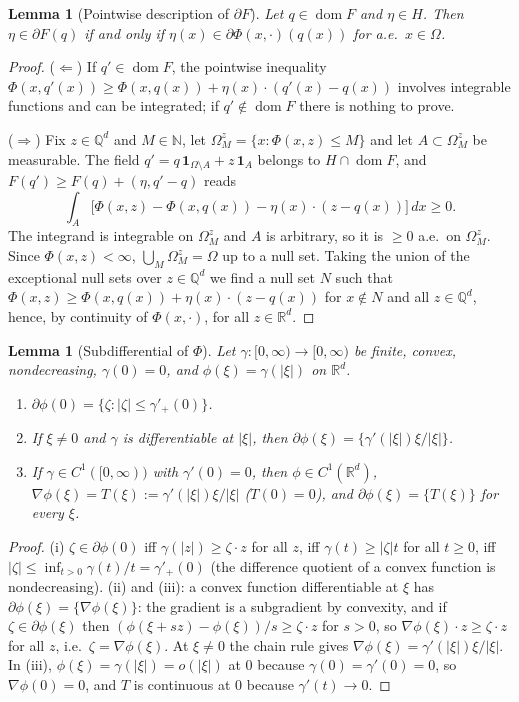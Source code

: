 \documentclass[11pt]{amsart}
\newtheorem{lemma}[theorem]{Lemma}
\theoremstyle{definition}
\theoremstyle{remark}
\numberwithin{equation}{section}
\newcommand{\R}{\mathbb{R}}
\newcommand{\Q}{\mathbb{Q}}
\newcommand{\dx}{\,dx}
\newcommand{\abs}[1]{\lvert #1\rvert}
\DeclareMathOperator{\dom}{dom}
\begin{document}
\begin{lemma}[Pointwise description of $\partial F$]\label{lem:pointwise}
Let $q\in\dom F$ and $\eta\in H$. Then $\eta\in\partial F(q)$ if and only if $\eta(x)\in\partial\Phi(x,\cdot)(q(x))$ for a.e.\ $x\in\Omega$.
\end{lemma}
\begin{proof}
($\Leftarrow$) If $q'\in\dom F$, the pointwise inequality $\Phi(x,q'(x))\ge\Phi(x,q(x))+\eta(x)\cdot(q'(x)-q(x))$ involves integrable functions and can be integrated; if $q'\notin\dom F$ there is nothing to prove.

($\Rightarrow$) Fix $z\in\Q^d$ and $M\in\mathbb N$, let $\Omega^z_M=\{x:\Phi(x,z)\le M\}$ and let $A\subset\Omega^z_M$ be measurable. The field $q'=q\,\mathbf 1_{\Omega\setminus A}+z\,\mathbf 1_A$ belongs to $H\cap\dom F$, and $F(q')\ge F(q)+(\eta,q'-q)$ reads
\[
\int_A\big[\Phi(x,z)-\Phi(x,q(x))-\eta(x)\cdot(z-q(x))\big]\dx\ge0 .
\]
The integrand is integrable on $\Omega^z_M$ and $A$ is arbitrary, so it is $\ge0$ a.e.\ on $\Omega^z_M$. Since $\Phi(x,z)<\infty$, $\bigcup_M\Omega^z_M=\Omega$ up to a null set. Taking the union of the exceptional null sets over $z\in\Q^d$ we find a null set $N$ such that $\Phi(x,z)\ge\Phi(x,q(x))+\eta(x)\cdot(z-q(x))$ for $x\notin N$ and all $z\in\Q^d$, hence, by continuity of $\Phi(x,\cdot)$, for all $z\in\R^d$.
\end{proof}

\begin{lemma}[Subdifferential of $\Phi$]\label{lem:subdiff-Phi}
Let $\gamma\colon[0,\infty)\to[0,\infty)$ be finite, convex, nondecreasing, $\gamma(0)=0$, and $\phi(\xi)=\gamma(\abs\xi)$ on $\R^d$.
\begin{enumerate}[label=\textup{(\roman*)}]
\item $\partial\phi(0)=\{\zeta:\abs\zeta\le\gamma'_+(0)\}$.
\item If $\xi\ne0$ and $\gamma$ is differentiable at $\abs\xi$, then $\partial\phi(\xi)=\{\gamma'(\abs\xi)\xi/\abs\xi\}$.
\item If $\gamma\in C^1([0,\infty))$ with $\gamma'(0)=0$, then $\phi\in C^1(\R^d)$, $\nabla\phi(\xi)=T(\xi):=\gamma'(\abs\xi)\xi/\abs\xi$ \textup($T(0)=0$\textup), and $\partial\phi(\xi)=\{T(\xi)\}$ for every $\xi$.
\end{enumerate}
\end{lemma}
\begin{proof}
(i) $\zeta\in\partial\phi(0)$ iff $\gamma(\abs z)\ge\zeta\cdot z$ for all $z$, iff $\gamma(t)\ge\abs\zeta t$ for all $t\ge0$, iff $\abs\zeta\le\inf_{t>0}\gamma(t)/t=\gamma'_+(0)$ (the difference quotient of a convex function is nondecreasing). (ii) and (iii): a convex function differentiable at $\xi$ has $\partial\phi(\xi)=\{\nabla\phi(\xi)\}$: the gradient is a subgradient by convexity, and if $\zeta\in\partial\phi(\xi)$ then $(\phi(\xi+sz)-\phi(\xi))/s\ge\zeta\cdot z$ for $s>0$, so $\nabla\phi(\xi)\cdot z\ge\zeta\cdot z$ for all $z$, i.e.\ $\zeta=\nabla\phi(\xi)$. At $\xi\ne0$ the chain rule gives $\nabla\phi(\xi)=\gamma'(\abs\xi)\xi/\abs\xi$. In (iii), $\phi(\xi)=\gamma(\abs\xi)=o(\abs\xi)$ at $0$ because $\gamma(0)=\gamma'(0)=0$, so $\nabla\phi(0)=0$, and $T$ is continuous at $0$ because $\gamma'(t)\to0$.
\end{proof}
\end{document}
